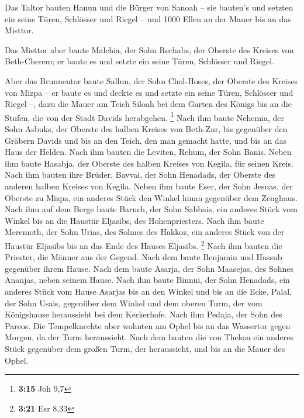  Das Taltor bauten Hanun und die Bürger von Sanoah -- sie
bauten's und setzten ein seine Türen, Schlösser und Riegel -- und 1000
Ellen an der Mauer bis an das Misttor.

 Das Misttor aber baute Malchia, der Sohn Rechabs, der
Oberste des Kreises von Beth-Cherem; er baute es und setzte ein seine
Türen, Schlösser und Riegel.

 Aber das Brunnentor baute Sallun, der Sohn Chol-Hoses, der
Oberste des Kreises von Mizpa -- er baute es und deckte es und setzte
ein seine Türen, Schlösser und Riegel --, dazu die Mauer am Teich Siloah
bei dem Garten des Königs bis an die Stufen, die von der Stadt Davids
herabgehen. \footnote{\textbf{3:15} Joh 9,7}  Nach ihm
baute Nehemia, der Sohn Asbuks, der Oberste des halben Kreises von
Beth-Zur, bis gegenüber den Gräbern Davids und bis an den Teich, den man
gemacht hatte, und bis an das Haus der Helden.  Nach ihm
bauten die Leviten, Rehum, der Sohn Banis. Neben ihm baute Hasabja, der
Oberste des halben Kreises von Kegila, für seinen Kreis. 
Nach ihm bauten ihre Brüder, Bavvai, der Sohn Henadads, der Oberste des
anderen halben Kreises von Kegila.  Neben ihm baute Eser,
der Sohn Jesuas, der Oberste zu Mizpa, ein anderes Stück den Winkel
hinan gegenüber dem Zeughaus.  Nach ihm auf dem Berge baute
Baruch, der Sohn Sabbais, ein anderes Stück vom Winkel bis an die
Haustür Eljasibs, des Hohenpriesters.  Nach ihm baute
Meremoth, der Sohn Urias, des Sohnes des Hakkoz, ein anderes Stück von
der Haustür Eljasibs bis an das Ende des Hauses Eljasibs. \footnote{\textbf{3:21}
  Esr 8,33}  Nach ihm bauten die Priester, die Männer aus
der Gegend.  Nach dem baute Benjamin und Hassub gegenüber
ihrem Hause. Nach dem baute Asarja, der Sohn Maasejas, des Sohnes
Ananjas, neben seinem Hause.  Nach ihm baute Binnui, der
Sohn Henadads, ein anderes Stück vom Hause Asarjas bis an den Winkel und
bis an die Ecke.  Palal, der Sohn Usais, gegenüber dem
Winkel und dem oberen Turm, der vom Königshause heraussieht bei dem
Kerkerhofe. Nach ihm Pedaja, der Sohn des Pareos.  Die
Tempelknechte aber wohnten am Ophel bis an das Wassertor gegen Morgen,
da der Turm heraussieht.  Nach dem bauten die von Thekoa
ein anderes Stück gegenüber dem großen Turm, der heraussieht, und bis an
die Mauer des Ophel.

